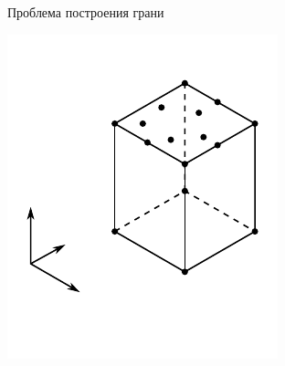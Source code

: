 \documentclass[]{beamer} %
\begin{document}
\begin{frame}{Проблема построения грани}
    \hspace*{10mm}
    \begin{minipage}{.3\textwidth}
        \centering
        \includegraphics[width=\linewidth]{affine.pdf}
      \end{minipage}
      \begin{minipage}{.1\textwidth}
        \centering

\end{minipage}
\end{frame}
\end{document}
